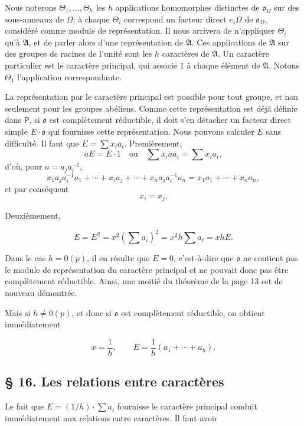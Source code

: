Nous noterons \(\Theta_1,\ldots,\Theta_h\) les \(h\) applications homomorphes distinctes de \(\mathfrak o_\Omega\) sur des sous-anneaux de \(\Omega\); à chaque \(\Theta_i\) correspond un facteur direct \(e_i\Omega\) de \(\mathfrak o_\Omega\), considéré comme module de représentation. Il nous arrivera de n'appliquer \(\Theta_i\) qu'à \(\mathfrak A\), et de parler alors d'une représentation de \(\mathfrak A\). Ces applications de \(\mathfrak A\) sur des groupes de racines de l'unité sont les \(h\) caractères de \(\mathfrak A\). Un caractère particulier est le caractère principal, qui associe \(1\) à chaque élément de \(\mathfrak A\). Notons \(\Theta_1\) l'application correspondante.

La représentation par le caractère principal est possible pour tout groupe, et non seulement pour les groupes abéliens. Comme cette représentation est déjà définie dans \(\mathsf P\), si \(\mathfrak o\) est complètement réductible, il doit s'en détacher un facteur direct simple \(E\cdot\mathfrak o\) qui fournisse cette représentation. Nous pouvons calculer \(E\) sans difficulté. Il faut que \(E=\sum x_i a_i\). Premièrement,
\[
aE=E\cdot 1\quad\text{ou}\quad \sum x_i a a_i=\sum x_i a_i,
\]
d'où, pour \(a=a_j a_i^{-1}\),
\[
x_1a_ja_i^{-1}a_1+\cdots+x_i a_j+\cdots+x_na_ja_i^{-1}a_n
=x_1a_1+\cdots+x_na_n,
\]
et par conséquent
\[
x_i=x_j.
\]

Deuxièmement,

\[
E=E^2=x^2\left(\sum a_i\right)^2=x^2h\sum a_i=xhE.
\]

Dans le cas \(h=0(p)\), il en résulte que \(E=0\), c'est-à-dire que \(\mathfrak o\) ne contient pas le module de représentation du caractère principal et ne pouvait donc pas être complètement réductible. Ainsi, une moitié du théorème de la page 13 est de nouveau démontrée.

Mais si \(h\ne0(p)\), et donc si \(\mathfrak o\) est complètement réductible, on obtient immédiatement

\[
x=\frac{1}{h},\qquad E=\frac{1}{h}(a_1+\cdots+a_h).
\]

\subsection*{\S{} 16. Les relations entre caractères}\label{fr-r823-relations-entre-caracteres}

Le fait que \(E=(1/h)\cdot\sum a_i\) fournisse le caractère principal conduit immédiatement aux relations entre caractères. Il faut avoir

